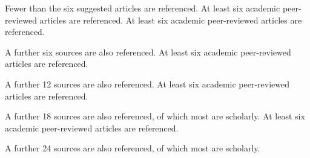 \documentclass{../fal_assignment}
\begin{document}
%

\begin{markingrubric}
%
%
%
%
        \grade\fail	Fewer than the six suggested articles are referenced.
        \grade		At least six academic peer-reviewed articles are referenced.
        \grade		At least six academic peer-reviewed articles are referenced.
        \par		A further six sources are also referenced.
        \grade		At least six academic peer-reviewed articles are referenced.
        \par		A further 12 sources are also referenced.
        \grade		At least six academic peer-reviewed articles are referenced.
        \par		A further 18 sources are also referenced, of which most are scholarly.
        \grade		At least six academic peer-reviewed articles are referenced.
        \par		A further 24 sources are also referenced, of which most are scholarly.

\end{markingrubric}
\end{document}
